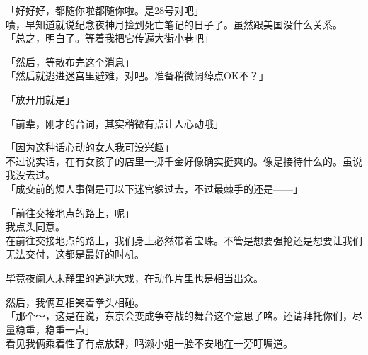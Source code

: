 「好好好，都随你啦都随你啦。是28号对吧」\\

啧，早知道就说纪念夜神月捡到死亡笔记的日子了。虽然跟美国没什么关系。\\

「总之，明白了。等着我把它传遍大街小巷吧」

「然后，等散布完这个消息」\\

「然后就逃进迷宫里避难，对吧。准备稍微阔绰点OK不？」

「放开用就是」

「前辈，刚才的台词，其实稍微有点让人心动哦」

「因为这种话心动的女人我可没兴趣」\\

不过说实话，在有女孩子的店里一掷千金好像确实挺爽的。像是接待什么的。虽说我没去过。\\

「成交前的烦人事倒是可以下迷宫躲过去，不过最棘手的还是——」

「前往交接地点的路上，呢」\\

我点头同意。\\

在前往交接地点的路上，我们身上必然带着宝珠。不管是想要强抢还是想要让我们无法交付，这都是最好的时机。

毕竟夜阑人未静里的追逃大戏，在动作片里也是相当出众。

然后，我俩互相笑着拳头相碰。\\

「那个～，这是在说，东京会变成争夺战的舞台这个意思了咯。还请拜托你们，尽量稳重，稳重一点」\\

看见我俩乘着性子有点放肆，鸣濑小姐一脸不安地在一旁叮嘱道。\\
